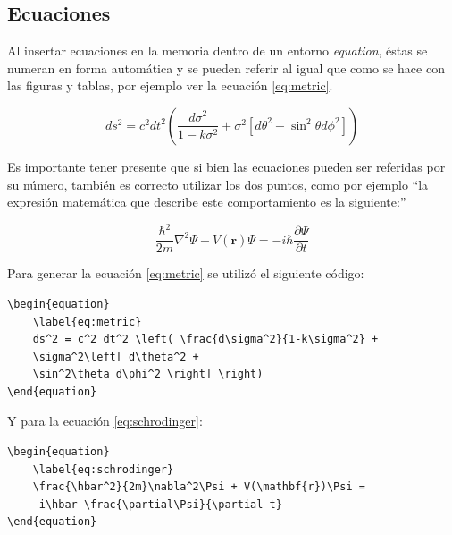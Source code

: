 \subsection{Ecuaciones}
\label{sec:Ecuaciones}

Al insertar ecuaciones en la memoria dentro de un entorno \textit{equation}, éstas se numeran en forma automática  y se pueden referir al igual que como se hace con las figuras y tablas, por ejemplo ver la ecuación \ref{eq:metric}.

\begin{equation}
	\label{eq:metric}
	ds^2 = c^2 dt^2 \left( \frac{d\sigma^2}{1-k\sigma^2} + \sigma^2\left[ d\theta^2 + \sin^2\theta d\phi^2 \right] \right)
\end{equation}
                                                        
Es importante tener presente que si bien las ecuaciones pueden ser referidas por su número, también es correcto utilizar los dos puntos, como por ejemplo ``la expresión matemática que describe este comportamiento es la siguiente:''

\begin{equation}
	\label{eq:schrodinger}
	\frac{\hbar^2}{2m}\nabla^2\Psi + V(\mathbf{r})\Psi = -i\hbar \frac{\partial\Psi}{\partial t}
\end{equation}

Para generar la ecuación \ref{eq:metric} se utilizó el siguiente código:

\begin{verbatim}
\begin{equation}
	\label{eq:metric}
	ds^2 = c^2 dt^2 \left( \frac{d\sigma^2}{1-k\sigma^2} + 
	\sigma^2\left[ d\theta^2 + 
	\sin^2\theta d\phi^2 \right] \right)
\end{equation}
\end{verbatim}

Y para la ecuación \ref{eq:schrodinger}:

\begin{verbatim}
\begin{equation}
	\label{eq:schrodinger}
	\frac{\hbar^2}{2m}\nabla^2\Psi + V(\mathbf{r})\Psi = 
	-i\hbar \frac{\partial\Psi}{\partial t}
\end{equation}

\end{verbatim}